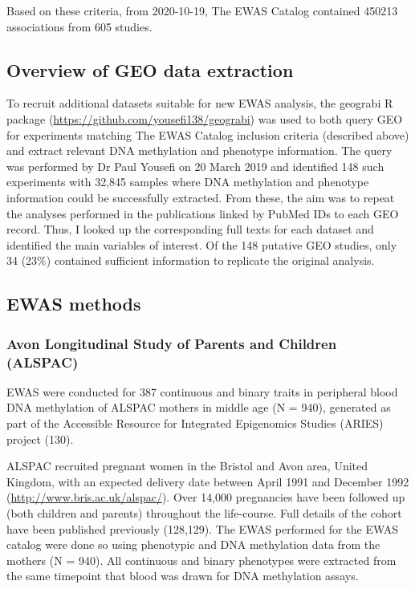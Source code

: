 \documentclass[11pt,oneside]{bristolthesis}
\begin{document}
Based on these criteria, from 2020-10-19, The EWAS Catalog contained 450213 associations from 605 studies.

\hypertarget{overview-of-geo-data-extraction}{%
\subsection{Overview of GEO data extraction}\label{overview-of-geo-data-extraction}}

To recruit additional datasets suitable for new EWAS analysis, the geograbi R package (\url{https://github.com/yousefi138/geograbi}) was used to both query GEO for experiments matching The EWAS Catalog inclusion criteria (described above) and extract relevant DNA methylation and phenotype information. The query was performed by Dr Paul Yousefi on 20 March 2019 and identified 148 such experiments with 32,845 samples where DNA methylation and phenotype information could be successfully extracted. From these, the aim was to repeat the analyses performed in the publications linked by PubMed IDs to each GEO record. Thus, I looked up the corresponding full texts for each dataset and identified the main variables of interest. Of the 148 putative GEO studies, only 34 (23\%) contained sufficient information to replicate the original analysis.

\hypertarget{ewas-methods-03}{%
\subsection{EWAS methods}\label{ewas-methods-03}}

\hypertarget{alspac-03}{%
\subsubsection{Avon Longitudinal Study of Parents and Children (ALSPAC)}\label{alspac-03}}

EWAS were conducted for 387 continuous and binary traits in peripheral blood DNA methylation of ALSPAC mothers in middle age (N = 940), generated as part of the Accessible Resource for Integrated Epigenomics Studies (ARIES) project (130).

ALSPAC recruited pregnant women in the Bristol and Avon area, United Kingdom, with an expected delivery date between April 1991 and December 1992 (\url{http://www.bris.ac.uk/alspac/}). Over 14,000 pregnancies have been followed up (both children and parents) throughout the life-course. Full details of the cohort have been published previously (128,129). The EWAS performed for the EWAS catalog were done so using phenotypic and DNA methylation data from the mothers (N = 940).
All continuous and binary phenotypes were extracted from the same timepoint that blood was drawn for DNA methylation assays.
\end{document}
